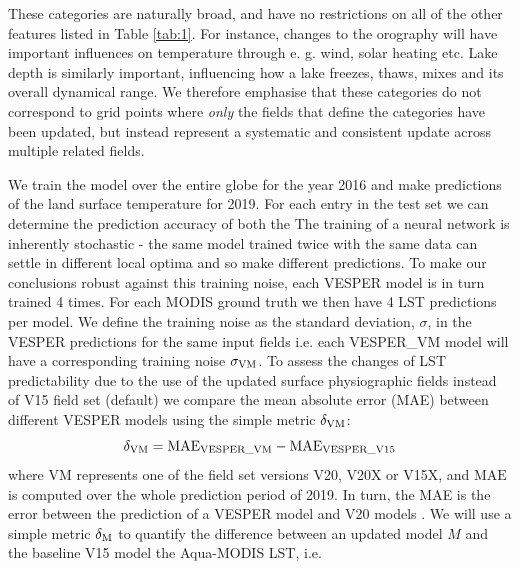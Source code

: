 \documentclass[hess, twostagejnl]{copernicus}
\providecommand{\DIFadd}[1]{{\protect\color{blue} \sf #1}} %
\providecommand{\DIFdel}[1]{{\protect\color{red} \scriptsize #1}} %
\providecommand{\DIFaddbegin}{} %
\providecommand{\DIFaddend}{} %
\providecommand{\DIFdelbegin}{} %
\providecommand{\DIFdelend}{} %
\begin{document}
\DIFdelbegin %
\DIFdel{These categories are naturally broad, and have no restrictions on all of the other features listed in Table \ref{tab:1}. For instance, changes to the orography will have important influences on temperature through e. g. wind, solar heating etc. Lake depth is similarly important, influencing how a lake freezes, thaws, mixes and its overall dynamical range. We therefore emphasise that these categories do not correspond to grid points where \textit{only} the fields that define the categories have been updated, but instead represent a systematic and consistent update across multiple related fields. }%

\DIFdel{We train the model over the entire globe for the year 2016 and make predictions of the land surface temperature for 2019. For each entry in the test set we can determine the prediction accuracy of both the }\DIFdelend \DIFaddbegin \DIFadd{The training of a neural network is inherently stochastic - the same model trained twice with the same data can settle in different local optima and so make different predictions. To make our conclusions robust against this training noise, each VESPER model is in turn trained 4 times. For each MODIS ground truth we then have 4 LST predictions per model. We define the training noise as the standard deviation, $\sigma$, in the VESPER predictions for the same input fields i.e. each VESPER\_VM model will have a corresponding training noise $\sigma_{\rm VM}$. To assess the changes of LST predictability due to the use of the updated surface physiographic fields instead of }\DIFaddend V15 \DIFaddbegin \DIFadd{field set (default) we compare the mean absolute error (MAE) between different VESPER models using the simple metric $\delta_{\rm VM}$:
}\begin{equation} 
	\delta_{\rm VM} = \text{MAE}_{\rm VESPER\_VM} - \text{MAE}_{\rm VESPER\_V15} 
\end{equation}
\DIFadd{where VM represents one of the field set versions V20, V20X or V15X, and $\text{MAE}$ is computed over the whole prediction period of 2019. In turn, the MAE is the error between the prediction of a VESPER model }\DIFaddend and \DIFdelbegin \DIFdel{V20 models . We will use a simple metric $\delta_{\rm M}$ to quantify the difference between an updated model $M$ and the baseline V15 model }\DIFdelend \DIFaddbegin \DIFadd{the Aqua-MODIS LST, }\DIFaddend i.e.
\DIFdelbegin %
\end{document}
